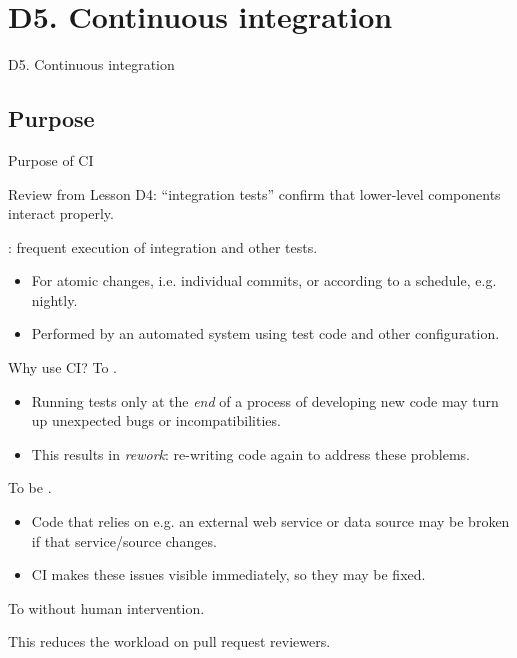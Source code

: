 \documentclass[12pt,aspectratio=169]{beamer}
\begin{document}
\section{D5. Continuous integration}
\begin{frame}{D5. Continuous integration}
  \tableofcontents[hideothersubsections]
\end{frame}

\subsection{Purpose}
\begin{frame}{Purpose of CI} \large

  Review from Lesson D4: “integration tests” confirm that lower-level components interact properly.

  \bigskip
  : frequent execution of integration and other tests.
  \begin{itemize}
    \item For atomic changes, i.e. individual commits, or according to a schedule, e.g. nightly.
    \item Performed by an automated system using test code and other configuration.
  \end{itemize}

\end{frame}

\begin{frame}{Why use CI?}
  To .
  \begin{itemize}
    \item Running tests only at the \emph{end} of a process of developing new code may turn up unexpected bugs or incompatibilities.
    \item This results in \emph{rework}: re-writing code again to address these problems.
  \end{itemize}

  \bigskip
  To be .
  \begin{itemize}
    \item Code that relies on e.g. an external web service or data source may be broken if that service/source changes.
    \item CI makes these issues visible immediately, so they may be fixed.
  \end{itemize}

  \bigskip
  To  without human intervention.

  \hspace{2em} This reduces the workload on pull request reviewers.

\end{frame}
\end{document}
